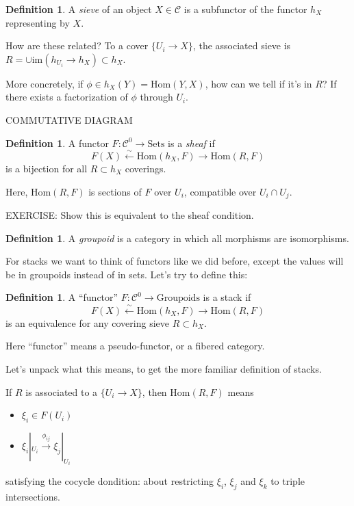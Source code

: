 \documentclass{amsart}
\theoremstyle{definition}
\newtheorem{definition}[dummy]{Definition}
\newcommand{\Hom}{\text{Hom}}
\begin{document}
\begin{definition}
A \emph{sieve} of an object $X\in\mathcal{C}$ is a subfunctor of the functor $h_X$ representing by $X$.
\end{definition}
 
How are these related?  To a cover $\{U_i\to X\}$, the associated sieve is
$R=\cup \text{im}(h_{U_i}\to h_X)\subset h_X$.

More concretely, if $\phi\in h_X(Y)=\Hom(Y,X)$, how can we tell if it's in $R$?  If there exists a factorization of $\phi$ through $U_i$.

COMMUTATIVE DIAGRAM

\begin{definition}
A functor $F:\mathcal{C}^0\to\text{Sets}$ is a \emph{sheaf} if 
$$F(X)\stackrel{\sim}\leftarrow \Hom(h_X, F)\to \Hom(R,F)$$ 
is a bijection for all $R\subset h_X$ coverings.
\end{definition}
Here, $\Hom(R,F)$ is sections of $F$ over $U_i$, compatible over $U_i\cap U_j$.


EXERCISE: Show this is equivalent to the sheaf condition.

\begin{definition}
A \emph{groupoid} is a category in which all morphisms are isomorphisms.
\end{definition}

For stacks we want to think of functors like we did before, except the values will be in groupoids instead of in sets.  Let's try to define this:

\begin{definition}
A ``functor'' $F:\mathcal{C}^0\to\text{Groupoids}$ is a stack if 
$$F(X)\stackrel{\sim}\leftarrow \Hom(h_X, F)\to \Hom(R,F)$$
is an equivalence for any covering sieve $R\subset h_X$.
\end{definition}

Here ``functor'' means a pseudo-functor, or a fibered category.


Let's unpack what this means, to get the more familiar definition of stacks.

If $R$ is associated to a $\{U_i\to X\}$, then $\Hom(R,F)$ means
\begin{itemize}
\item $\xi_i\in F(U_i)$
\item $\xi_i|_{U_i}\stackrel{\phi_{ij}}\to \xi_j|_{U_i}$
\end{itemize}
satisfying the cocycle dondition: about restricting $\xi_i$, $\xi_j$ and $\xi_k$ to triple intersections.
\end{document}
